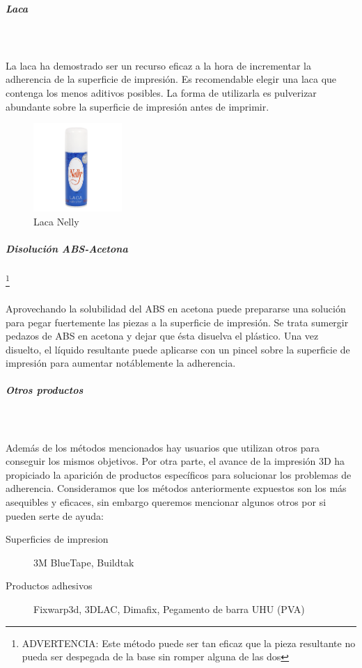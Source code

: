 \documentclass[11pt,a4paper]{article}
\begin{document}
				\subparagraph{Laca}\mbox{}\\\\
La laca ha demostrado ser un recurso eficaz a la hora de incrementar la adherencia de la superficie de impresión. Es recomendable elegir una laca que contenga los menos aditivos posibles. La forma de utilizarla es pulverizar abundante sobre la superficie de impresión antes de imprimir.
\begin{figure}[H]
\centering
\includegraphics[width=0.3\textwidth,cfbox=azul_marcos 4pt 0pt]{FOTOS/LACA}
\caption*{Laca Nelly}
\end{figure}
				\subparagraph{Disolución ABS-Acetona}\footnote{ADVERTENCIA: Este método puede ser tan eficaz que la pieza resultante no pueda ser despegada de la base sin romper alguna de las dos} \mbox{}\\\\
Aprovechando la solubilidad del ABS en acetona puede prepararse una solución para pegar fuertemente las piezas a la superficie de impresión. Se trata sumergir pedazos de ABS en acetona y dejar que ésta disuelva el plástico. Una vez disuelto, el líquido resultante puede aplicarse con un pincel sobre la superficie de impresión para aumentar notáblemente la adherencia.
				\subparagraph{Otros productos}\mbox{}\\\\
Además de los métodos mencionados hay usuarios que utilizan otros para conseguir los mismos objetivos. Por otra parte, el avance de la impresión 3D ha propiciado la aparición de productos específicos para solucionar los problemas de adherencia. Consideramos que los métodos anteriormente expuestos son los más asequibles y eficaces, sin embargo queremos mencionar algunos otros por si pueden serte de ayuda:
\begin{description}
\item[Superficies de impresion] 3M BlueTape, Buildtak
\item[Productos adhesivos] Fixwarp3d, 3DLAC, Dimafix, Pegamento de barra UHU (PVA)
\end{description}
\end{document}
